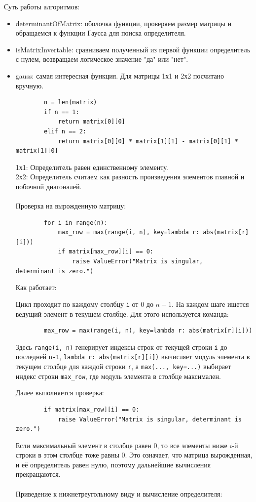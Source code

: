 Суть работы алгоритмов:
\begin{itemize}
	\item determinantOfMatrix: оболочка функции, проверяем размер матрицы и обращаемся к функции Гаусса для поиска определителя.
	\item isMatrixInvertable: сравниваем полученный из первой функции определитель с нулем, возвращаем логическое значение "да" или "нет".
	\item gauss: самая интересная функция. Для матрицы 1х1 и 2х2 посчитано вручную.
	\begin{lstlisting}
		n = len(matrix)
		if n == 1:
			return matrix[0][0] 
		elif n == 2:
			return matrix[0][0] * matrix[1][1] - matrix[0][1] * matrix[1][0] 
	\end{lstlisting}
	1х1: Определитель равен единственному элементу.\\
	2х2: Определитель считаем как разность произведения элементов главной и побочной диагоналей.\\ \\
	Проверка на вырожденную матрицу:
	\begin{lstlisting}
		for i in range(n):
			max_row = max(range(i, n), key=lambda r: abs(matrix[r][i]))
			if matrix[max_row][i] == 0:
				raise ValueError("Matrix is singular, 			determinant is zero.")
	\end{lstlisting}
	
	Как работает:
	
	Цикл проходит по каждому столбцу \texttt{i} от $0$ до $n-1$. На каждом шаге ищется ведущий элемент в текущем столбце. Для этого используется команда:
	
	\begin{lstlisting}
		max_row = max(range(i, n), key=lambda r: abs(matrix[r][i]))
	\end{lstlisting}
	
	Здесь \texttt{range(i, n)} генерирует индексы строк от текущей строки \texttt{i} до последней \texttt{n-1}, \texttt{lambda r: abs(matrix[r][i])} вычисляет модуль элемента в текущем столбце для каждой строки \texttt{r}, а \texttt{max(..., key=...)} выбирает индекс строки \texttt{max\_row}, где модуль элемента в столбце максимален.
	
	Далее выполняется проверка:
	\begin{lstlisting}
		if matrix[max_row][i] == 0:
			raise ValueError("Matrix is singular, determinant is zero.")
	\end{lstlisting}
	
	Если максимальный элемент в столбце равен $0$, то все элементы ниже $i$-й строки в этом столбце тоже равны $0$. Это означает, что матрица вырожденная, и её определитель равен нулю, поэтому дальнейшие вычисления прекращаются.\\ \\
	Приведение к нижнетреугольному виду и вычисление определителя:
	

\end{itemize}
